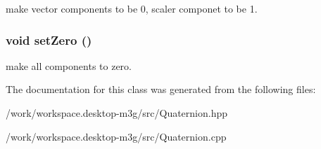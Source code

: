 make vector components to be 0, scaler componet to be 1. \hypertarget{classm3g_1_1Quaternion_47affd1a10b589811fc4828c1a2e0c6d}{
\subsubsection[{setZero}]{\setlength{\rightskip}{0pt plus 5cm}void setZero ()}}
\label{classm3g_1_1Quaternion_47affd1a10b589811fc4828c1a2e0c6d}


make all components to zero. 

The documentation for this class was generated from the following files:\begin{CompactItemize}
\item 
/work/workspace.desktop-m3g/src/Quaternion.hpp\item 
/work/workspace.desktop-m3g/src/Quaternion.cpp\end{CompactItemize}
